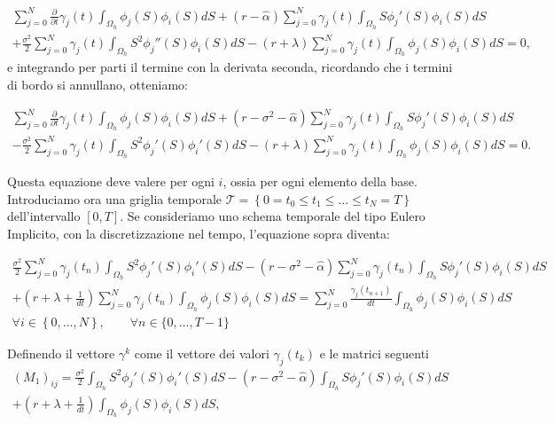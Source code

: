 \documentclass[a4paper,10pt]{report}
\theoremstyle{plain}
\theoremstyle{definition}
\theoremstyle{remark}
\begin{document}
\begin{multline*}
\sum_{j=0}^{N}\frac{\partial}{\partial t}\gamma_j(t)\int_{\Omega_h}\phi_j(S)\phi_i(S)dS+(r-\hat{\alpha})\sum_{j=0}^{N}\gamma_j(t)\int_{\Omega_h}S\phi_j'(S)\phi_i(S)dS\\
+\frac{\sigma^2}{2} \sum_{j=0}^{N} \gamma_j(t)\int_{\Omega_h} S^2 \phi_j''(S)\phi_i(S)dS -(r+\lambda) \sum_{j=0}^{N}\gamma_j(t)\int_{\Omega_h}\phi_j(S)\phi_i(S)dS=0,
\end{multline*}
e integrando per parti il termine con la derivata seconda, ricordando che i termini di bordo si annullano, otteniamo:

\begin{multline*}
\sum_{j=0}^{N}\frac{\partial}{\partial t}\gamma_j(t)\int_{\Omega_h}\phi_j(S)\phi_i(S)dS
+(r-\sigma^2-\hat{\alpha})\sum_{j=0}^{N}\gamma_j(t)\int_{\Omega_h}S\phi_j'(S)\phi_i(S)dS\\
-\frac{\sigma^2}{2}\sum_{j=0}^{N} \gamma_j(t)\int_{\Omega_h} S^2\phi_j'(S)\phi_i'(S)dS
-(r+\lambda)\sum_{j=0}^{N}\gamma_j(t)\int_{\Omega_h}\phi_j(S)\phi_i(S)dS=0.
\end{multline*}

Questa equazione deve valere per ogni $i$, ossia per ogni elemento della base.
Introduciamo ora una griglia temporale $\mathcal{T}=\left\{0= t_0\leq t_1\leq ... \leq t_N=T\right\}$ dell'intervallo $[0,T]$. Se consideriamo uno schema temporale del tipo Eulero Implicito, con la discretizzazione nel tempo, l'equazione sopra diventa:

\begin{multline}
\label{eq:discretizedPDEprice}\frac{\sigma^2}{2}\sum_{j=0}^{N} \gamma_j(t_n)\int_{\Omega_h} S^2\phi_j'(S)\phi_i'(S)dS
-(r-\sigma^2-\hat{\alpha})\sum_{j=0}^{N}\gamma_j(t_n)\int_{\Omega_h}S\phi_j'(S)\phi_i(S)dS\\
+\left(r+\lambda+\frac{1}{dt}\right)\sum_{j=0}^{N}\gamma_j(t_n)\int_{\Omega_h}\phi_j(S)\phi_i(S)dS=\sum_{j=0}^{N}\frac{\gamma_j(t_{n+1})}{dt}\int_{\Omega_h}\phi_j(S)\phi_i(S)dS \\ \forall i \in \left\lbrace 0,\dots,N \right\rbrace, \qquad \forall n \in \lbrace0,\dots,T-1\rbrace
\end{multline}

Definendo il vettore  ${\gamma}^k$ come il vettore dei valori $\gamma_j(t_k)$ e le matrici seguenti
\begin{multline*}
 (M_1)_{ij}=\frac{\sigma^2}{2}\int_{\Omega_h}S^2\phi_j'(S)\phi_i'(S)dS-(r-\sigma^2-\hat{\alpha})\int_{\Omega_h}S\phi_j'(S)\phi_i(S)dS\\
 +\left(r+\lambda+\frac{1}{dt}\right)\int_{\Omega_h}\phi_j(S)\phi_i(S)dS,
\end{multline*}
\end{document}
